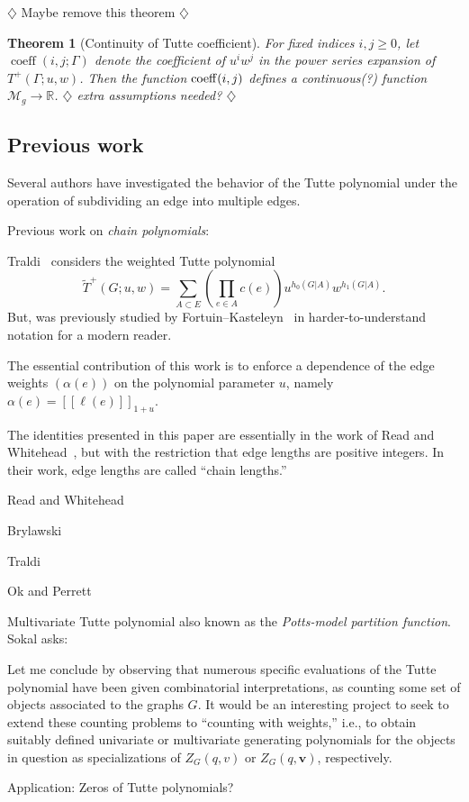 \documentclass{amsart}
\newtheorem{thm}{Theorem}
\theoremstyle{definition}
\newcommand{\RR}{\mathbb{R}}
\DeclareMathOperator{\coeff}{coeff}
\newcommand{\fanalog}[2]{[\![#2]\!]_{#1}}
\newcommand{\harry}[1]{{\color{red} \sf $\diamondsuit$  {#1} $\diamondsuit$ }}
\newcommand{\note}[1]{\harry{#1}}
\begin{document}
\note{Maybe remove this theorem}
\begin{thm}[Continuity of Tutte coefficient]
For fixed indices $i,j\geq 0$,
let $\coeff(i,j; \Gamma)$
denote the coefficient of $u^i w^j$ in the power series expansion of $T^+(\Gamma; u,w)$.
Then the function ${\rm coeff}(i,j)$
defines a continuous(?) 
function $\mathcal M_g \to \RR$.
\note{extra assumptions needed?}
\end{thm}

\subsection{Previous work} 

Several authors have investigated the behavior of the Tutte polynomial under the operation of subdividing an edge into multiple edges.

Previous work on {\em chain polynomials}:

Traldi~\cite{Tra1} considers the weighted Tutte polynomial
\[
	\widetilde T^+(G; u,w) = \sum_{A \subset E} \left( \prod_{e \in A} c(e) \right) u^{h_0(G|A)} w^{h_1(G|A)} .
\]
But, was previously studied by Fortuin--Kasteleyn~\cite{FK} in harder-to-understand notation for a modern reader.

The essential contribution of this work is to enforce a dependence of the edge weights $(\alpha(e))$ on the polynomial parameter $u$, namely $\alpha(e) = \fanalog{1 + u}{\ell(e)}$.


The identities presented in this paper are essentially in the work of Read and Whitehead~\cite{RW2}, but with the restriction that edge lengths are positive integers. In their work, edge lengths are called ``chain lengths.''

Read and Whitehead \cite{RW2}
\cite{RW1,RW2}

Brylawski \cite{Bry}

Traldi \cite{Tra1,Tra2,Tra3}

Ok and Perrett \cite{OP}

Multivariate Tutte polynomial \cite{Sok-potts}
also known as the {\em Potts-model partition function}.
Sokal \cite{Sok-potts} asks:
\begin{displayquote}
Let me conclude by observing that numerous specific evaluations of the Tutte polynomial have been given combinatorial interpretations, 
as counting some set of objects associated to the graphs $G$. 
It would be an interesting project to seek to extend these counting problems to ``counting with weights,''
i.e., to obtain suitably defined univariate or multivariate generating polynomials for the objects in question as specializations of 
$Z_G(q,v)$ or $Z_G(q,\mathbf{v})$, respectively.
\end{displayquote}
Application: Zeros of Tutte polynomials?
\end{document}
